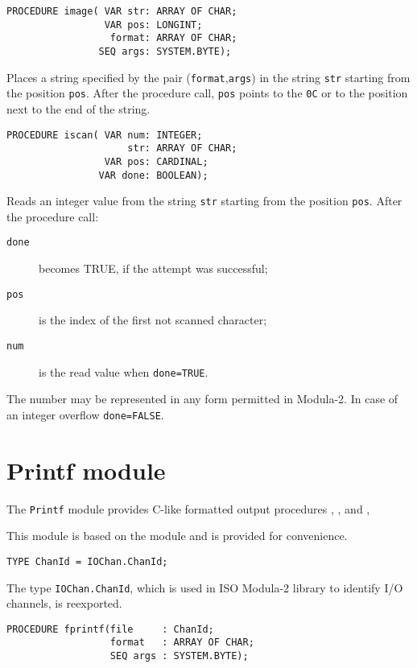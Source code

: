 {\samepage
{}
\begin{verbatim}
PROCEDURE image( VAR str: ARRAY OF CHAR;
                 VAR pos: LONGINT;
                  format: ARRAY OF CHAR;
                SEQ args: SYSTEM.BYTE);
\end{verbatim}
}
\ModuleList
Places a string specified by the pair (\verb|format|,\verb|args|)
in the string {\tt str}
starting from the position {\tt pos}.
After the procedure call, {\tt pos} points to
the {\tt 0C} or to the position next to the end of the string.

{\samepage
{}
\begin{verbatim}
PROCEDURE iscan( VAR num: INTEGER;
                     str: ARRAY OF CHAR;
                 VAR pos: CARDINAL;
                VAR done: BOOLEAN);
\end{verbatim}
}
\ModuleList
Reads an integer value from the string \verb|str|
starting from the position \verb|pos|.
After the procedure call:
\begin{description}
\item[{\tt done}] becomes TRUE, if the attempt was successful;
\item[{\tt pos }] is the index of the first not scanned character;
\item[{\tt num }] is the read value when \verb'done=TRUE'.
\end{description}

The number may be represented in any form permitted in
Modula-2. In case of an integer overflow {\tt done=FALSE}.

\section{Printf module}
\renewcommand{\ModuleI}{Printf}
\OneModule

The {\tt Printf} module provides C-like formatted output procedures
, , and ,

This module is based on the  module and is provided
for convenience.

{\samepage
{}
\begin{verbatim}
TYPE ChanId = IOChan.ChanId;
\end{verbatim}
}
The type {\tt IOChan.ChanId}, which is used in ISO Modula-2 library
to identify I/O channels, is reexported.

{\samepage
{}
\begin{verbatim}
PROCEDURE fprintf(file     : ChanId;
                  format   : ARRAY OF CHAR;
                  SEQ args : SYSTEM.BYTE);
\end{verbatim}
}
\ModuleList


